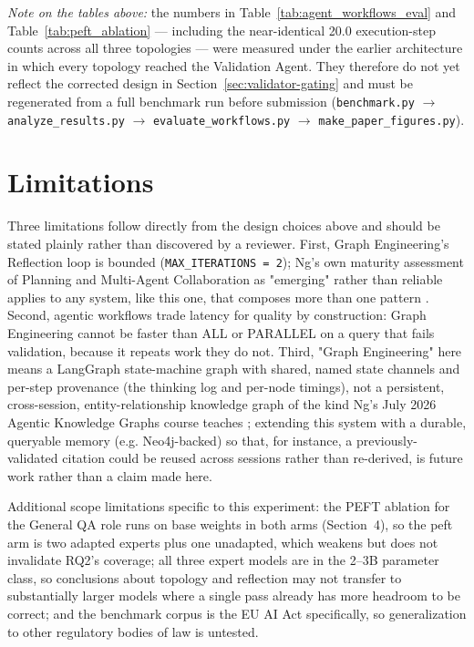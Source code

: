 \documentclass[journal,10pt,compsoc,onecolumn]{IEEEtran}
\begin{document}
\emph{Note on the tables above:} the numbers in Table~\ref{tab:agent_workflows_eval} and Table~\ref{tab:peft_ablation} --- including the near-identical 20.0 execution-step counts across all three topologies --- were measured under the earlier architecture in which every topology reached the Validation Agent. They therefore do not yet reflect the corrected design in Section~\ref{sec:validator-gating} and must be regenerated from a full benchmark run before submission (\texttt{benchmark.py} $\rightarrow$ \texttt{analyze\_results.py} $\rightarrow$ \texttt{evaluate\_workflows.py} $\rightarrow$ \texttt{make\_paper\_figures.py}).

\section{Limitations}
\label{sec:limitations}
Three limitations follow directly from the design choices above and should be stated plainly rather than discovered by a reviewer. First, Graph Engineering's Reflection loop is bounded (\texttt{MAX\_ITERATIONS = 2}); Ng's own maturity assessment of Planning and Multi-Agent Collaboration as "emerging" rather than reliable applies to any system, like this one, that composes more than one pattern \cite{ng_playbook_2026}. Second, agentic workflows trade latency for quality by construction: Graph Engineering cannot be faster than ALL or PARALLEL on a query that fails validation, because it repeats work they do not. Third, "Graph Engineering" here means a LangGraph state-machine graph with shared, named state channels and per-step provenance (the thinking log and per-node timings), not a persistent, cross-session, entity-relationship knowledge graph of the kind Ng's July 2026 Agentic Knowledge Graphs course teaches \cite{ng_playbook_2026}; extending this system with a durable, queryable memory (e.g. Neo4j-backed) so that, for instance, a previously-validated citation could be reused across sessions rather than re-derived, is future work rather than a claim made here.

Additional scope limitations specific to this experiment: the PEFT ablation for the General QA role runs on base weights in both arms (Section~4), so the peft arm is two adapted experts plus one unadapted, which weakens but does not invalidate RQ2's coverage; all three expert models are in the 2--3B parameter class, so conclusions about topology and reflection may not transfer to substantially larger models where a single pass already has more headroom to be correct; and the benchmark corpus is the EU AI Act specifically, so generalization to other regulatory bodies of law is untested.
\end{document}
